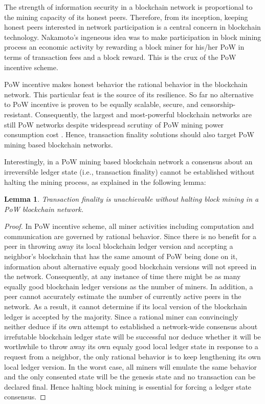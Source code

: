 \documentclass[conference]{IEEEtran}
\newtheorem{lemma}[theorem]{Lemma}
\begin{document}
The strength of information security in a blockchain network is proportional to the mining capacity of its honest peers. Therefore, from its inception, keeping honest peers interested in network participation is a central concern in blockchain technology. Nakamoto's ingeneous idea was to make participation in block mining process an economic activity \cite{Kroll2013TheEO} by rewarding a block miner for his/her PoW in terms of transaction fees and a block reward. This is the crux of the PoW incentive scheme.

PoW incentive makes honest behavior the rational behavior \cite{bitcoin} in the blockchain network. This particular feat is the source of its resilience. So far no alternative to PoW incentive is proven to be equally scalable, secure, and censorship-resistant. Consequently, the largest and most-powerful blockchain networks are still PoW networks despite widespread scrutiny of PoW mining power consumption cost \cite{powcost}. Hence, transaction finality solutions should also target PoW mining based blockchain networks.

Interestingly, in a PoW mining based blockchain network a consensus about an irreversible ledger state (i.e., transaction finality) cannot be established without halting the mining process, as explained in the following lemma:

\begin{lemma}
\label{l-halt}
Transaction finality is unachievable without halting block mining in a PoW blockchain network.  
\end{lemma}

\begin{proof}
In PoW incentive scheme, all miner activities including computation and communication are governed by rational behavior. Since there is no benefit for a peer in throwing away its local blockchain ledger version and accepting a neighbor's blockchain that has the same amount of PoW being done on it, information about alternative equaly good blockchain versions will not spreed in the network. Consequently, at any instance of time there might be as many equally good blockchain ledger versions as the number of miners. In addition, a peer cannot accurately estimate the number of currently active peers in the network. As a result, it cannot determine if its local version of the blockchain ledger is accepted by the majority. Since a rational miner can convincingly neither deduce if its own attempt to established a network-wide consensus about irrefutable blockchain ledger state will be successful nor deduce whether it will be worthwhile to throw away its own equaly good local ledger state in response to a request from a neighbor, the only rational behavior is to keep lengthening its own local ledger version. In the worst case, all miners will emulate the same behavior and the only consented state will be the genesis state and no transaction can be declared final. Hence halting block mining is essential for forcing a ledger state consensus.             
\end{proof}                
\end{document}
